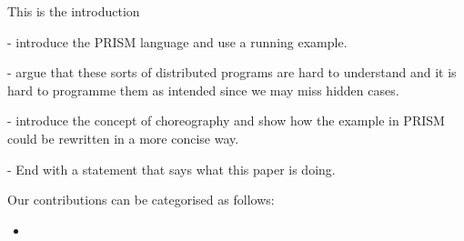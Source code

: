 This is the introduction

- introduce the PRISM language and use a running example.

- argue that these sorts of distributed programs are hard to
understand and it is hard to programme them as intended since we may
miss hidden cases.

- introduce the concept of choreography and show how the example in
PRISM could be rewritten in a more concise way.

- End with a statement that says what this paper is doing.

 Our contributions can be categorised as follows: 
\begin{itemize}
\item
\end{itemize}



